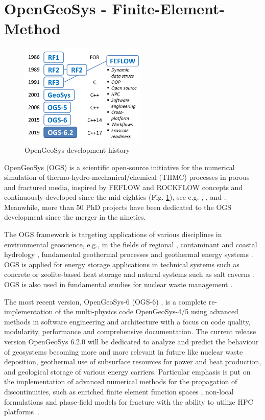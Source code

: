 \section{OpenGeoSys - Finite-Element-Method}
\label{app:ogs}

\begin{figure}
  \centering
  \includegraphics[width=6cm]{figures/ogs-2019}
  \caption{OpenGeoSys development history}
  \label{fig:ogs-history}
\end{figure}
OpenGeoSys (OGS) is a scientific open-source initiative for the numerical simulation of thermo-hydro-mechanical/chemical (THMC) processes in porous and fractured media, inspired by FEFLOW \cite{Diersch2014} and ROCKFLOW concepts and continuously developed since the mid-eighties (Fig. \ref{fig:ogs-history}), see e.g. \cite{Kolditz:1990}, \cite{Wollrath:1990}, \cite{Kroehn:1991} and \cite{Helmig:1993}. Meanwhile, more than 50 PhD projects have been dedicated to the OGS development since the merger in the nineties.

The OGS framework is targeting applications of various disciplines in environmental geoscience, e.g., in the fields of regional \cite{Jing20181989}, contaminant \cite{Nixdorf2017598} and coastal hydrology \cite{Walther2017648}, fundamental geothermal processes \cite{Parisio2019} and geothermal energy systems \cite{Meng2018971,HEIN201680}.
%
OGS is applied for energy storage applications in technical systems such as concrete \cite{Miao2019977} or  zeolite-based heat storage \cite{Lehmann20191102} and natural systems such as salt caverns \cite{Bottcher2017,Nagel2017}. 
%
OGS is also used in fundamental studies for nuclear waste management \cite{Shao201933}.

The most recent version, OpenGeoSys-6 (OGS-6) \cite{Naumov:2018,Bilke2019}, is a complete re-implementation of the multi-physics code OpenGeoSys-4/5 \cite{Kolditz2004225,Wang:2006} using advanced methods in software engineering and architecture with a focus on code quality, modularity, performance and comprehensive documentation. The current release version OpenGeoSys 6.2.0 \cite{ogs:6.2.0} will be dedicated to analyze and predict the behaviour of geosystems becoming more and more relevant in future like nuclear waste deposition, geothermal use of subsurface resources for power and heat production, and geological storage of various energy carriers. Particular emphasis is put on the implementation of advanced numerical methods for the propagation of discontinuities, such as enriched finite element function spaces \cite{Watanabe2012}, non-local formulations \cite{Parisio2017} and phase-field models for fracture \cite{Yoshioka2019} with the ability to utilize HPC platforms~\cite{Wang2014a,Wang:2017}.

